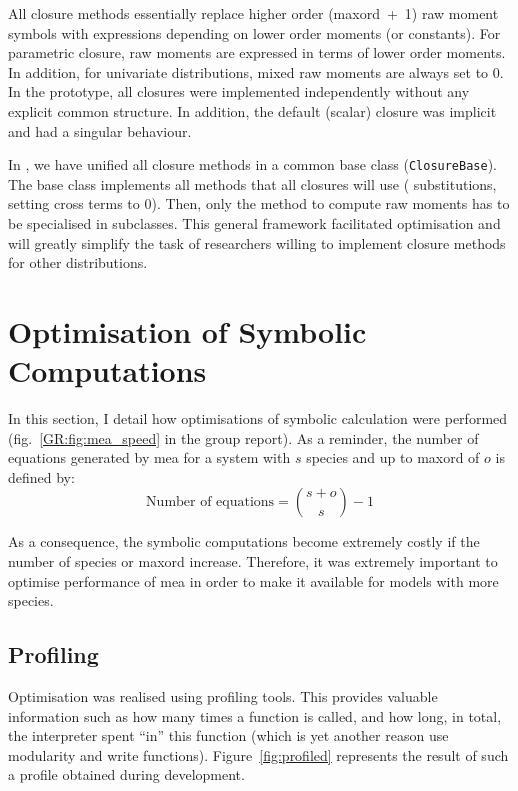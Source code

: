All closure methods essentially replace higher order (\gls{maxord}~+~1) raw moment symbols with expressions depending on lower order moments (or constants).
For parametric closure, raw moments are expressed in terms of lower order moments.
In addition, for univariate distributions, mixed raw moments are always set to $0$.
In the \mat{} prototype, all closures were implemented independently without any explicit common structure.
In addition, the default (scalar) closure was implicit and had a singular behaviour.

In \means, we have unified all closure methods in a common base class (\texttt{ClosureBase}).
The base class implements all methods that all closures will use (\eg{} substitutions, setting cross terms to $0$).
Then, only the method to compute raw moments has to be specialised in subclasses.
This general framework facilitated optimisation and will greatly simplify the task of researchers willing
to implement closure methods for other distributions.

\section{Optimisation of Symbolic Computations}

\label{sec:optimisation}

In this section, I detail how optimisations of symbolic calculation were performed (fig.~\ref*{GR:fig:mea_speed} in the group report).
As a reminder, the number of equations generated by \gls{mea} for a system with $s$ species and up to \gls{maxord} of $o$
is defined by:
\begin{equation}
    \text{Number of equations} = {{s + o} \choose {s}} - 1
    \label{eq:number_of_equations}
\end{equation}

As a consequence, the symbolic computations become extremely costly if the number of species or \gls{maxord} increase.
Therefore, it was extremely important to optimise performance of \gls{mea} in order to make it available for models with more species.

\subsection{Profiling}

Optimisation was realised using \py{} profiling tools.
This provides valuable information such as how many times a function is called, and how long, in total,
the interpreter spent ``in'' this function (which is yet another reason use modularity and write functions).
Figure~\ref{fig:profiled} represents the result of such a profile obtained during development.

